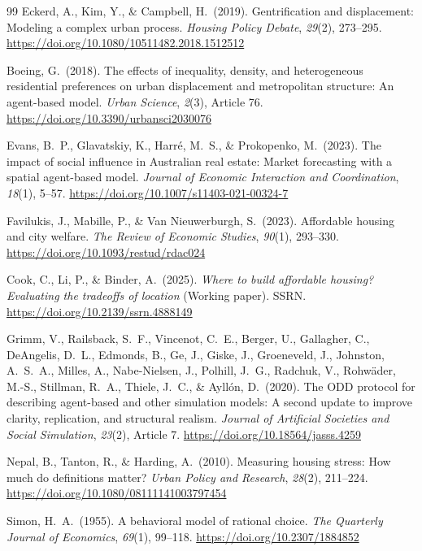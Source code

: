 \documentclass[10pt,a4paper]{article}
\begin{document}
\begin{thebibliography}{99}
Eckerd, A., Kim, Y., \& Campbell, H.\ (2019). Gentrification and displacement: Modeling a complex urban process.
\textit{Housing Policy Debate}, \textit{29}(2), 273--295.
\url{https://doi.org/10.1080/10511482.2018.1512512}

Boeing, G.\ (2018). The effects of inequality, density, and heterogeneous residential preferences on urban displacement and metropolitan structure: An agent-based model.
\textit{Urban Science}, \textit{2}(3), Article 76.
\url{https://doi.org/10.3390/urbansci2030076}

Evans, B.\ P., Glavatskiy, K., Harré, M.\ S., \& Prokopenko, M.\ (2023). The impact of social influence in Australian real estate: Market forecasting with a spatial agent-based model.
\textit{Journal of Economic Interaction and Coordination}, \textit{18}(1), 5--57.
\url{https://doi.org/10.1007/s11403-021-00324-7}

Favilukis, J., Mabille, P., \& Van Nieuwerburgh, S.\ (2023). Affordable housing and city welfare.
\textit{The Review of Economic Studies}, \textit{90}(1), 293--330.
\url{https://doi.org/10.1093/restud/rdac024}

Cook, C., Li, P., \& Binder, A.\ (2025). \textit{Where to build affordable housing? Evaluating the tradeoffs of location} (Working paper). SSRN.
\url{https://doi.org/10.2139/ssrn.4888149}

Grimm, V., Railsback, S.\ F., Vincenot, C.\ E., Berger, U., Gallagher, C., DeAngelis, D.\ L., Edmonds, B., Ge, J., Giske, J., Groeneveld, J., Johnston, A.\ S.\ A., Milles, A., Nabe-Nielsen, J., Polhill, J.\ G., Radchuk, V., Rohw\"ader, M.-S., Stillman, R.\ A., Thiele, J.\ C., \& Ayll\'on, D.\ (2020). The ODD protocol for describing agent-based and other simulation models: A second update to improve clarity, replication, and structural realism.
\textit{Journal of Artificial Societies and Social Simulation}, \textit{23}(2), Article 7.
\url{https://doi.org/10.18564/jasss.4259}

Nepal, B., Tanton, R., \& Harding, A.\ (2010). Measuring housing stress: How much do definitions matter?
\textit{Urban Policy and Research}, \textit{28}(2), 211--224.
\url{https://doi.org/10.1080/08111141003797454}

Simon, H.\ A.\ (1955). A behavioral model of rational choice.
\textit{The Quarterly Journal of Economics}, \textit{69}(1), 99--118.
\url{https://doi.org/10.2307/1884852}


\end{thebibliography}
\end{document}
